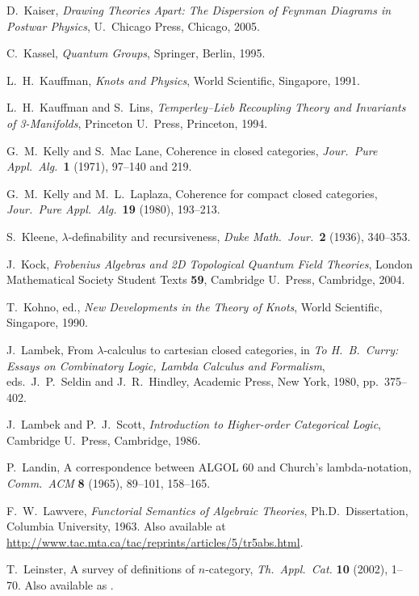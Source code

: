 \documentclass[12pt]{article}
\begin{document}
\begin{thebibliography}{99}
D.\ Kaiser, \textsl{Drawing Theories Apart: The Dispersion of Feynman
Diagrams in Postwar Physics}, U.\ Chicago Press, Chicago, 2005.

C.\ Kassel, \textsl{Quantum Groups}, Springer, Berlin, 1995.

L.\ H.\ Kauffman, {\sl Knots and Physics}, World Scientific,
Singapore, 1991.

L.\ H.\ Kauffman and S.\ Lins, {\sl Temperley--Lieb Recoupling Theory
and Invariants of 3-Manifolds}, Princeton U.\ Press, Princeton, 1994.

 G.\ M.\ Kelly and S.\ Mac Lane, Coherence in closed 
categories, {\sl Jour.\ Pure Appl.\ Alg.\ }{\bf 1} (1971), 97--140
and 219.

 G.\ M.\ Kelly and M.\ L.\ Laplaza, Coherence
for compact closed categories, {\sl Jour.\ Pure Appl.\ Alg.\ }{\bf 19}
(1980), 193--213.

S.\ Kleene, $\lambda$-definability and recursiveness,
{\sl Duke Math.\ Jour.\ }{\bf 2} (1936), 340--353. 

J.\ Kock, \textsl{Frobenius Algebras and 2{D} Topological Quantum 
Field Theories}, London Mathematical Society Student Texts \textbf{59},
Cambridge U.\ Press, Cambridge, 2004.

T.\ Kohno, ed., \textsl{New Developments in the Theory of Knots},
World Scientific, Singapore, 1990.

 J.\ Lambek, From $\lambda$-calculus to cartesian
closed categories, in {\sl To H.\ B.\ Curry: Essays on Combinatory
Logic, Lambda Calculus and Formalism}, eds.\ J.\ P.\ Seldin and J.\
R.\ Hindley, Academic Press, New York, 1980, pp.\ 375--402. 

 J.\ Lambek and P.\ J.\ Scott, {\sl Introduction to
Higher-order Categorical Logic}, Cambridge U.\ Press, Cambridge,
1986.  

 P.\ Landin, A correspondence between ALGOL 60 and
Church's lambda-notation, {\sl Comm.\ ACM} {\bf 8} (1965), 89--101,
158--165.

 F.\ W.\ Lawvere, {\sl Functorial Semantics of 
Algebraic Theories}, Ph.D.\ Dissertation, Columbia University, 1963.
Also available at 
\href{http://www.tac.mta.ca/tac/reprints/articles/5/tr5abs.html}
{http://www.tac.mta.ca/tac/reprints/articles/5/tr5abs.html}.

T.\ Leinster, A survey of definitions of $n$-category,
\textsl{Th.\ Appl.\ Cat.} \textbf{10} (2002), 1--70.
Also available as .


\end{thebibliography}
\end{document}
